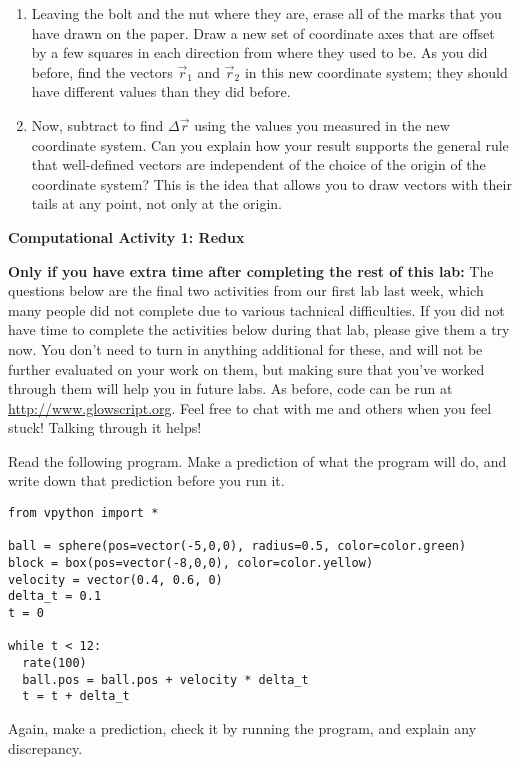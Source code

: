 \documentclass[11pt]{article}
\begin{document}
\begin{enumerate}
\item Leaving the bolt and the nut where they are, erase all of the marks
  that you have drawn on the paper.  Draw a new set of coordinate axes
  that are offset by a few squares in each direction from where they used 
  to be.  As you did before, find the vectors ${\vec{r}_1}$ and ${\vec{r}_2}$ 
  in this new coordinate system; they should have different values
  than they did before. 

\item Now, subtract to find $\Delta {\vec r}$ using the values you measured
  in the new coordinate system.  Can you explain how your result supports the 
  general rule that well-defined vectors are independent of the choice of the 
  origin of the coordinate system?  This is the idea that allows you to
  draw vectors with their tails at any point, not only at the origin.

\end{enumerate}







\newpage

\begin{center}
\medskip
{\bf{Computational Activity 1: Redux}} 
\end{center}
\medskip
\textbf{Only if you have extra time after completing the rest of this lab:} The questions below are the final two activities from our first lab last week, which many people did not complete due to various tachnical difficulties. If you did not have time to complete the activities below during that lab, please give them a try now. You don't need to turn in anything additional for these, and will not be further evaluated on your work on them, but making sure that you've worked through them will help you in future labs. As before, code can be run at \url{http://www.glowscript.org}. Feel free to chat with me and others when you feel stuck! Talking through it helps!




Read the following program. Make a prediction of what the program will do, and write down that prediction 
before you run it. 
{\small{
\begin{verbatim}
from vpython import *

ball = sphere(pos=vector(-5,0,0), radius=0.5, color=color.green)
block = box(pos=vector(-8,0,0), color=color.yellow)
velocity = vector(0.4, 0.6, 0)
delta_t = 0.1
t = 0

while t < 12:
  rate(100)
  ball.pos = ball.pos + velocity * delta_t
  t = t + delta_t
\end{verbatim}
}}
\noindent Again, make a prediction, check it by running the program, and explain
any discrepancy.
\end{document}
